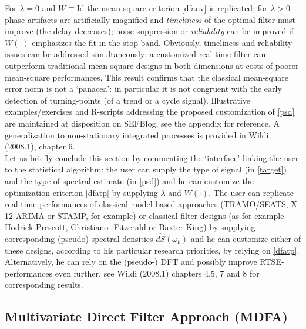 \documentclass[11pt]{article}
\begin{document}
For $\lambda=0$ and $W\equiv \textrm{Id}$ the mean-square criterion \ref{dfanv} is replicated; for $\lambda>0$ phase-artifacts are artificially magnified and \emph{timeliness} of the optimal filter must improve (the delay decreases); noise suppression or \emph{reliability} can be improved if $W(\cdot)$ emphasizes the  fit in the stop-band. Obviously, timeliness and reliability issues can be addressed simultaneously: a customized real-time filter can outperform traditional mean-square designs in both dimensions at costs of poorer mean-square performances. This result confirms that the classical mean-square error norm is not a `panacea': in particular it is not congruent with the early detection of turning-points (of a trend or a cycle signal). Illustrative examples/exercises and R-scripts addressing the proposed customization of \ref{psd} are maintained at disposition on SEFBlog, see the appendix for reference. A generalization to  non-stationary integrated processes is provided in Wildi (2008.1), chapter 6.\\
Let us briefly conclude this section by commenting the `interface' linking the user to the statistical algorithm: the user can supply the type of signal (in \ref{target}) and the type of spectral estimate (in \ref{psd}) and he can customize the optimization criterion \ref{dfatp} by supplying $\lambda$ and $W(\cdot)$. The user can replicate real-time performances of classical model-based approaches (TRAMO/SEATS, X-12-ARIMA or STAMP, for example) or classical filter designs (as for example Hodrick-Prescott, Christiano- Fitzerald or Baxter-King) by supplying corresponding (pseudo) spectral densities $\hat{dS}(\omega_k)$ and he can customize either of these designs, according to his particular research priorities, by relying on \ref{dfatp}. Alternatively, he can rely on the (pseudo-) DFT and possibly improve RTSE-performances even further, see Wildi (2008.1) chapters 4,5, 7 and 8 for corresponding results.


\subsection{Multivariate Direct Filter Approach (MDFA)}\label{mdfa}
\end{document}
